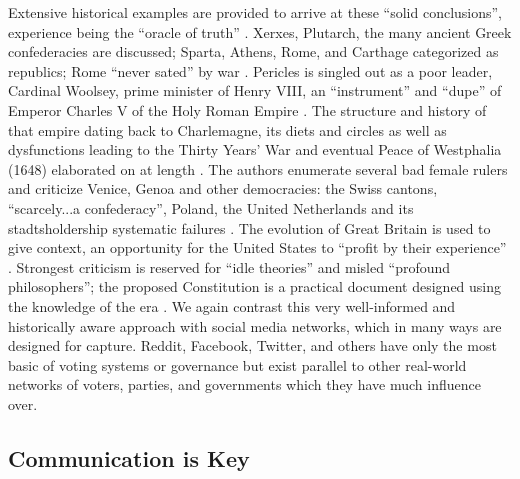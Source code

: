Extensive historical examples are provided to arrive at these ``solid conclusions'', experience being the ``oracle of truth'' \cite[n. 8, 20]{fed}.
Xerxes, Plutarch, the many ancient Greek confederacies are discussed; Sparta, Athens, Rome, and Carthage categorized as republics; Rome ``never sated'' by war \cite[n. 18, 6]{fed}.
Pericles is singled out as a poor leader, Cardinal Woolsey, prime minister of Henry VIII, an ``instrument'' and ``dupe'' of Emperor Charles V of the Holy Roman Empire \cite[n. 6]{fed}.
The structure and history of that empire dating back to Charlemagne, its diets and circles as well as dysfunctions leading to the Thirty Years' War and eventual Peace of Westphalia (1648) elaborated on at length \cite[n. 19]{fed}.
The authors enumerate several bad female rulers and criticize Venice, Genoa and other democracies: the Swiss cantons, ``scarcely...a confederacy'', Poland, the United Netherlands and its stadtsholdership systematic failures \cite[n. 19, 20]{fed}.
The evolution of Great Britain is used to give context, an opportunity for the United States to ``profit by their experience'' \cite[n. 5]{fed}.
Strongest criticism is reserved for ``idle theories'' and misled ``profound philosophers''; the proposed Constitution is a practical document designed using the knowledge of the era \cite[n. 6, 11]{fed}.
We again contrast this very well-informed and historically aware approach with social media networks, which in many ways are designed for capture.
Reddit, Facebook, Twitter, and others have only the most basic of voting systems or governance but exist parallel to other real-world networks of voters, parties, and governments which they have much influence over.

\subsection{Communication is Key}

